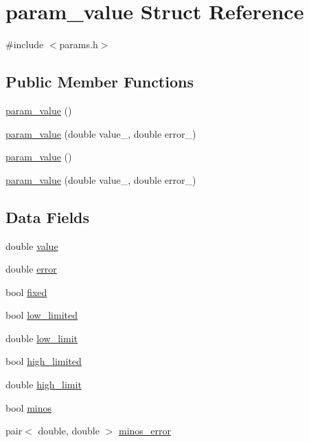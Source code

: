 \hypertarget{structparam__value}{}\section{param\+\_\+value Struct Reference}
\label{structparam__value}


{\ttfamily \#include $<$params.\+h$>$}

\subsection*{Public Member Functions}
\begin{DoxyCompactItemize}
\item 
\mbox{\hyperlink{structparam__value_aecfb6e0ae91934d6a3abde54a689231d}{param\+\_\+value}} ()
\item 
\mbox{\hyperlink{structparam__value_a1254852f85d52c7588fac83f7c27f9fb}{param\+\_\+value}} (double value\+\_\+, double error\+\_\+)
\item 
\mbox{\hyperlink{structparam__value_aecfb6e0ae91934d6a3abde54a689231d}{param\+\_\+value}} ()
\item 
\mbox{\hyperlink{structparam__value_a1254852f85d52c7588fac83f7c27f9fb}{param\+\_\+value}} (double value\+\_\+, double error\+\_\+)
\end{DoxyCompactItemize}
\subsection*{Data Fields}
\begin{DoxyCompactItemize}
\item 
double \mbox{\hyperlink{structparam__value_adf404931755182278f4f8fef2ce21332}{value}}
\item 
double \mbox{\hyperlink{structparam__value_a9620ca46ddd1100e994cfe826a0fb805}{error}}
\item 
bool \mbox{\hyperlink{structparam__value_a98ba7029e26ebb868022fc0d05983491}{fixed}}
\item 
bool \mbox{\hyperlink{structparam__value_a18dbcf6493ad9f72aae98027b4d7c3aa}{low\+\_\+limited}}
\item 
double \mbox{\hyperlink{structparam__value_a2378510a8ed93d8a9029dc2e82ec16d6}{low\+\_\+limit}}
\item 
bool \mbox{\hyperlink{structparam__value_a881d327889085a52dc91d3e9dac971b3}{high\+\_\+limited}}
\item 
double \mbox{\hyperlink{structparam__value_ab1d4e16a2cdd2ca1223df4a2e1c0b0e1}{high\+\_\+limit}}
\item 
bool \mbox{\hyperlink{structparam__value_a96116557f4d2be9ad99ca7ac72f417a1}{minos}}
\item 
pair$<$ double, double $>$ \mbox{\hyperlink{structparam__value_a0fb9e67df5c2a26a7a179205254badd4}{minos\+\_\+error}}
\end{DoxyCompactItemize}


